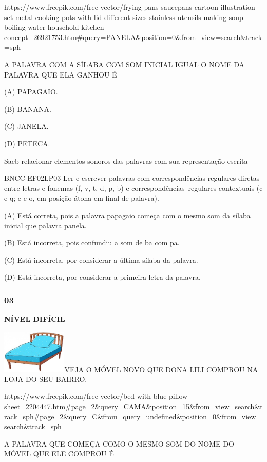 https://www.freepik.com/free-vector/frying-pans-saucepans-cartoon-illustration-set-metal-cooking-pots-with-lid-different-sizes-stainless-utensils-making-soup-boiling-water-household-kitchen-concept\_26921753.htm\#query=PANELA\&position=0\&from\_view=search\&track=sph

\protect\hypertarget{_Hlk129268378}{}{}A PALAVRA COM A SÍLABA COM SOM
INICIAL IGUAL O NOME DA PALAVRA QUE ELA GANHOU É

(A) PAPAGAIO.

(B) BANANA.

(C) JANELA.

(D) PETECA.

Saeb relacionar elementos sonoros das palavras com sua representação
escrita

BNCC EF02LP03 Ler e escrever palavras com correspondências regulares
diretas entre letras e fonemas (f, v, t, d, p, b) e
correspondências~regulares contextuais (c e q; e e o, em posição átona
em final de palavra).

(A) Está correta, pois a palavra papagaio começa com o mesmo som da
sílaba inicial que palavra panela.

(B) Está incorreta, pois confundiu a som de ba com pa.

(C) Está incorreta, por considerar a última sílaba da palavra.

(D) Está incorreta, por considerar a primeira letra da palavra.

\subsubsection{03}\label{section-96}

\textbf{NÍVEL DIFÍCIL}

\includegraphics[width=1.22293in,height=0.81839in]{media/image140.jpeg}VEJA
O MÓVEL NOVO QUE DONA LILI COMPROU NA LOJA DO SEU BAIRRO.

https://www.freepik.com/free-vector/bed-with-blue-pillow-sheet\_2204447.htm\#page=2\&query=CAMA\&position=15\&from\_view=search\&track=sph\#page=2\&query=C\&from\_query=undefined\&position=0\&from\_view=search\&track=sph

\protect\hypertarget{_Hlk129272831}{}{}A PALAVRA QUE COMEÇA COMO O MESMO
SOM DO NOME DO MÓVEL QUE ELE COMPROU É

